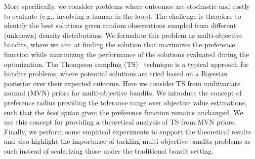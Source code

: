 More specifically, we consider problems where outcomes are stochastic and costly to evaluate (e.g., involving a human in the loop). The challenge is therefore to identify the best solutions given random observations sampled from different (unknown) density distributions. We formulate this problem as multi-objective bandits, where we aim at finding the solution that maximizes the preference function while maximizing the performance of the solutions evaluated during the optimization. The Thompson sampling (TS)~\cite{Thompson1933} technique is a typical approach for bandits problems, where potential solutions are tried based on a Bayesian posterior over their expected outcome. Here we consider TS from multivariate normal (MVN) priors for multi-objective bandits.
We introduce the concept of preference radius providing the tolerance range over objective value estimations, such that the \emph{best option} given the preference function remains unchanged. We use this concept for providing a theoretical analysis of TS from MVN priors.
%
Finally, we perform some empirical experiments to support the theoretical results and also highlight the importance of tackling multi-objective bandits problems as such instead of scalarizing those under the traditional bandit setting. 

